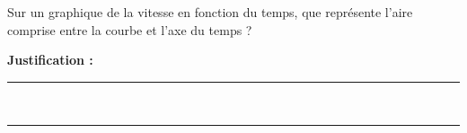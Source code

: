 Sur un graphique de la vitesse en fonction du temps, que représente l'aire comprise entre la courbe et l'axe du temps ?

\choices

\noindent\textbf{Justification :} \hrulefill \\[2.5ex]
\rule{\linewidth}{0.4pt} \\[2.5ex]
\rule{\linewidth}{0.4pt}
\vfill
